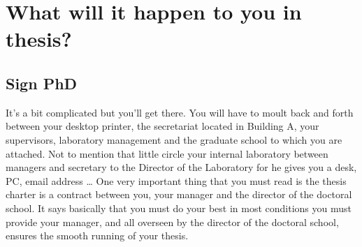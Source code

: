 \chapter{What will it happen to you in thesis?}

\section{Sign PhD}
It's a bit complicated but you'll get there.
You will have to moult back and forth between your desktop printer, the secretariat located in Building A, your supervisors, laboratory management and the graduate school to which you are attached.
Not to mention that little circle your internal laboratory between managers and secretary to the Director of the Laboratory for he gives you a desk, PC, email address \dots
One very important thing that you must read is the thesis charter is a contract between you, your manager and the director of the doctoral school.
It says basically that you must do your best in most conditions you must provide your manager, and all overseen by the director of the doctoral school, ensures the smooth running of your thesis.

